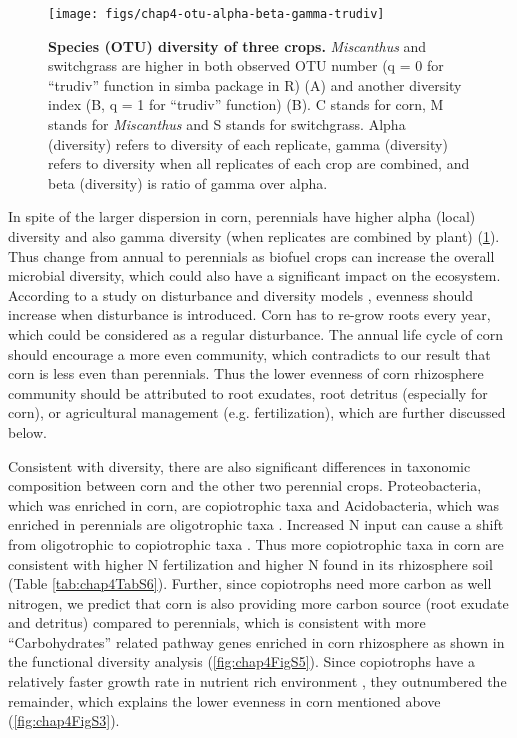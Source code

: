 \documentclass[]{msu-thesis}
\begin{document}
\begin{figure}[tbph!]
  \centering
  \texttt{[image: figs/chap4-otu-alpha-beta-gamma-trudiv]}
  \caption[Species (OTU) diversity of three crops]{\textbf{Species (OTU)
  diversity of three crops.} \textit{Miscanthus} and switchgrass are
  higher in both observed OTU number (q = 0 for ``trudiv'' function in
  simba package in R) (A) and another diversity index (B, q = 1 for
  ``trudiv'' function) (B). C stands for corn, M stands for
  \textit{Miscanthus} and S stands for switchgrass. Alpha (diversity)
refers to diversity of each replicate, gamma (diversity) refers to
diversity when all replicates of each crop are combined, and beta
(diversity) is ratio of gamma over alpha.}
  \label{fig:chap4FigS2}
\end{figure}

In spite of the larger dispersion in corn, perennials have higher alpha
(local) diversity and also gamma diversity (when replicates are combined
by plant) (\cref{fig:chap4FigS2}). Thus change from annual to perennials
as biofuel crops can increase the overall microbial diversity, which
could also have a significant impact on the ecosystem. According to a
study on disturbance and diversity models
\cite{svensson_disturbance-diversity_2012}, evenness should increase
when disturbance is introduced. Corn has to re-grow roots every year,
which could be considered as a regular disturbance. The annual life
cycle of corn should encourage a more even community, which contradicts
to our result that corn is less even than perennials. Thus the lower
evenness of corn rhizosphere community should be attributed to root
exudates, root detritus (especially for corn), or agricultural
management (e.g. fertilization), which are further discussed below.

Consistent with diversity, there are also significant differences in
taxonomic composition between corn and the other two perennial crops.
Proteobacteria, which was enriched in corn, are copiotrophic taxa and
Acidobacteria, which was enriched in perennials are oligotrophic taxa
\cite{fierer_toward_2007,eilers_shifts_2010}.  Increased N input can
cause a shift from oligotrophic to copiotrophic taxa
\cite{fierer_comparative_2012,wessen_differential_2010}. Thus more
copiotrophic taxa in corn are consistent with higher N fertilization and
higher N found in its rhizosphere soil (Table \ref{tab:chap4TabS6}).
Further, since copiotrophs need more carbon as well nitrogen, we predict
that corn is also providing more carbon source (root exudate and
detritus) compared to perennials, which is consistent with more
``Carbohydrates'' related pathway genes enriched in corn rhizosphere as
shown in the functional diversity analysis (\cref{fig:chap4FigS5}).
Since copiotrophs have a relatively faster growth rate in nutrient rich
environment \cite{fierer_comparative_2012}, they outnumbered the
remainder, which explains the lower evenness in corn mentioned above
(\cref{fig:chap4FigS3}).
\end{document}

